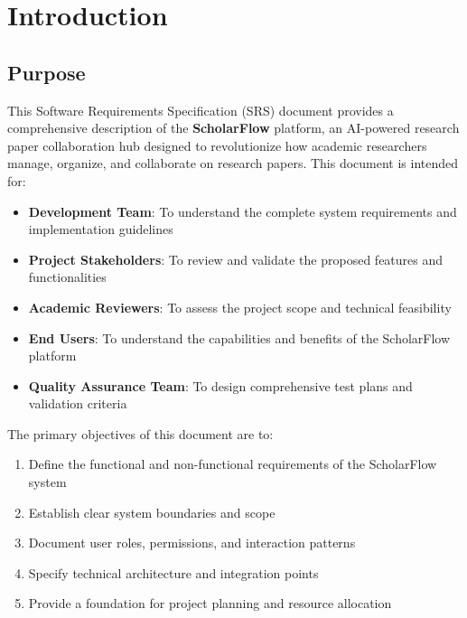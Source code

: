 \chapter{Introduction}

\section{Purpose}

This Software Requirements Specification (SRS) document provides a comprehensive description of the \textbf{ScholarFlow} platform, an AI-powered research paper collaboration hub designed to revolutionize how academic researchers manage, organize, and collaborate on research papers. This document is intended for:

\begin{itemize}[leftmargin=*]
    \item \textbf{Development Team}: To understand the complete system requirements and implementation guidelines
    \item \textbf{Project Stakeholders}: To review and validate the proposed features and functionalities
    \item \textbf{Academic Reviewers}: To assess the project scope and technical feasibility
    \item \textbf{End Users}: To understand the capabilities and benefits of the ScholarFlow platform
    \item \textbf{Quality Assurance Team}: To design comprehensive test plans and validation criteria
\end{itemize}

The primary objectives of this document are to:
\begin{enumerate}
    \item Define the functional and non-functional requirements of the ScholarFlow system
    \item Establish clear system boundaries and scope
    \item Document user roles, permissions, and interaction patterns
    \item Specify technical architecture and integration points
    \item Provide a foundation for project planning and resource allocation
\end{enumerate}


